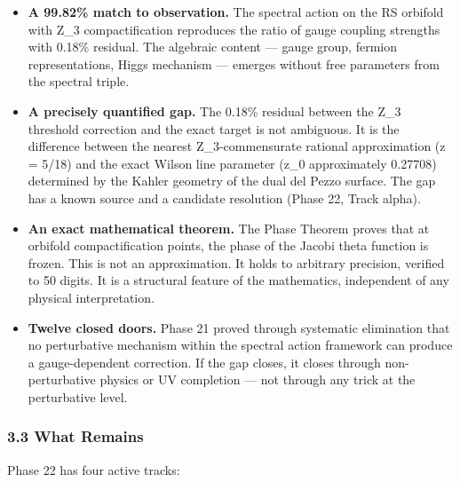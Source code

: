 \begin{itemize}[nosep,leftmargin=*]
  \item \textbf{A 99.82\% match to observation.} The spectral action on the RS orbifold with Z\_3 compactification reproduces the ratio of gauge coupling strengths with 0.18\% residual. The algebraic content — gauge group, fermion representations, Higgs mechanism — emerges without free parameters from the spectral triple.
  \item \textbf{A precisely quantified gap.} The 0.18\% residual between the Z\_3 threshold correction and the exact target is not ambiguous. It is the difference between the nearest Z\_3-commensurate rational approximation (z = 5/18) and the exact Wilson line parameter (z\_0 approximately 0.27708) determined by the Kahler geometry of the dual del Pezzo surface. The gap has a known source and a candidate resolution (Phase 22, Track alpha).
  \item \textbf{An exact mathematical theorem.} The Phase Theorem proves that at orbifold compactification points, the phase of the Jacobi theta function is frozen. This is not an approximation. It holds to arbitrary precision, verified to 50 digits. It is a structural feature of the mathematics, independent of any physical interpretation.
  \item \textbf{Twelve closed doors.} Phase 21 proved through systematic elimination that no perturbative mechanism within the spectral action framework can produce a gauge-dependent correction. If the gap closes, it closes through non-perturbative physics or UV completion — not through any trick at the perturbative level.
\end{itemize}


\subsubsection*{3.3 What Remains}


Phase 22 has four active tracks:


